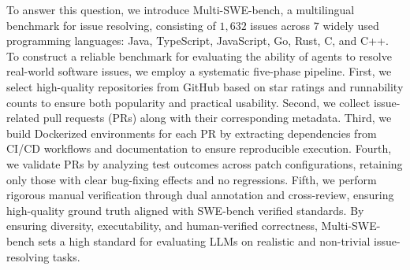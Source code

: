 \documentclass[11pt, a4paper, logo, copyright, nonumbering]{seed}
\newcommand{\multiswebench}{Multi-SWE-bench\xspace}
\begin{document}
To answer this question, we introduce \multiswebench, a multilingual benchmark for issue resolving, consisting of $1,632$ issues across $7$ widely used programming languages: Java, TypeScript, JavaScript, Go, Rust, C, and C++.
To construct a reliable benchmark for evaluating the ability of agents to resolve real-world software issues, we employ a systematic five-phase pipeline. 
First, we select high-quality repositories from GitHub based on star ratings and runnability counts to ensure both popularity and practical usability. 
Second, we collect issue-related pull requests (PRs) along with their corresponding metadata. 
Third, we build Dockerized environments for each PR by extracting dependencies from CI/CD workflows and documentation to ensure reproducible execution.
Fourth, we validate PRs by analyzing test outcomes across patch configurations, retaining only those with clear bug-fixing effects and no regressions.
Fifth, we perform rigorous manual verification through dual annotation and cross-review, ensuring high-quality ground truth aligned with SWE-bench verified standards.
By ensuring diversity, executability, and human-verified correctness, \multiswebench sets a high standard for evaluating LLMs on realistic and non-trivial issue-resolving tasks.

\end{document}

